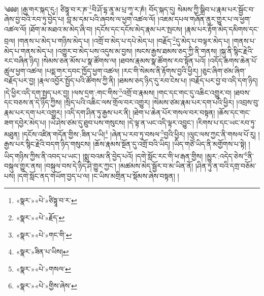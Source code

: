  ༄༅༅། །རྒྱ་གར་སྐད་དུ:། ཙིཏྟཱ་བ་ར་ཎ་\footnote{«སྣར་»«པེ་»ཙིཏྟཱ་བ་ར་}བི་ཤོ་དྷ་ནཱ་མ་པྲ་ཀཱ་ར་ཎཾ། བོད་སྐད་དུ། སེམས་ཀྱི་སྒྲིབ་པ་རྣམ་པར་སྦྱོང་བ་ཞེས་བྱ་བའི་རབ་ཏུ་བྱེད་པ། བླ་མ་དམ་པའི་ཞབས་ལ་ཕྱག་འཚལ་ལོ། །འཇམ་དཔལ་གཞོན་ནུར་གྱུར་པ་ལ་ཕྱག་འཚལ་ལོ། །ཐོག་མ་མཐའ་མ་མེད་ཞི་བ། །དངོས་དང་དངོས་མེད་རྣམ་པར་སྤངས། །རྣམ་པར་རྟོག་མེད་དམིགས་དང་བྲལ། །གནས་པ་མེད་པ་གཉིས་མེད་པ། །འགྲོ་བ་མེད་པ་དཔེ་མེད་པ། །བརྗོད་\footnote{«སྣར་»«པེ་»རྗོད་}དུ་མེད་པ་བལྟར་མེད་པ། །གནས་པ་མེད་པ་གནས་མེད་པ། །འགྱུར་བ་མེད་པས་འདུས་མ་བྱས། །སངས་རྒྱས་ཐམས་ཅད་ཀྱི་ནི་གནས། །སྐུ་ནི་སྙིང་རྗེའི་རང་བཞིན་ཉིད། །སེམས་ཅན་མོས་པ་སྣ་ཚོགས་ལ། །ཐབས་རྣམས་སྣ་ཚོགས་རབ་སྟོན་པའོ། །འདོད་ཆགས་ཆེན་པོ་ཚུལ་ཕྱག་འཚལ། །པདྨ་གར་དབང་ཁྱོད་ཕྱག་འཚལ། །རང་གི་སེམས་ནི་རྟོགས་བྱའི་ཕྱིར། །ཅུང་ཞིག་ཙམ་ཞིག་བརྗོད་པར་བྱ། །རྣལ་འབྱོར་སྤྱོད་པའི་ཚོགས་ཀྱི་ནི། །ཐམས་ཅད་ཉིད་དུ་རབ་ངེས་པ། །བརྗོད་པར་བྱ་བ་འདི་དག་ཉིད། །དེ་ཕྱིར་འདི་དག་སྤྱད་པར་བྱ། །ལས་དྲག་:གང་གིས་\footnote{«སྣར་»«པེ་»གང་གི་}འགྲོ་བ་རྣམས། །གང་དང་གང་དུ་འཆིང་འགྱུར་བ། །ཐབས་དང་བཅས་ན་དེ་ཉིད་ཀྱིས། །སྲིད་པའི་འཆིང་ལས་གྲོལ་བར་འགྱུར། །སེམས་ཙམ་རྣམ་པར་དག་པའི་ཕྱིར། །འབྲས་བུ་རྣམ་པར་དག་པར་འགྱུར། །འདི་དག་ཤིན་ཏུ་རྒྱས་པར་ནི། །ཐེག་པ་ཆེན་པོར་གསལ་བར་བསྟན། །ཆོས་དང་གང་ཟག་དབྱེར་མེད་པ། །ཡེ་ཤེས་ཙམ་དུ་ཐུབ་པས་གསུངས། །དེ་ལྟ་ན་ཡང་འདི་ལྟར་འབྱུང་། །རིགས་པ་དང་ཡང་རབ་ཏུ་མཐུན། །དངོས་འཛིན་གདོན་གྱིས་:ཟིན་པ་ཡི།\footnote{«སྣར་»ཟིན་པ་ཡིས།} །ཞེན་པ་རབ་ཏུ་བསལ་\footnote{«སྣར་»«པེ་»གསལ་}བྱའི་ཕྱིར། །ལུང་ལས་ཀྱང་ནི་གསལ་པོ་རུ། །རྒྱས་པར་སྙིང་རྗེའི་བདག་ཉིད་གསུངས། །ཆོས་རྣམས་སྔོན་དུ་འགྲོ་བའི་ཡིད། །ཡིད་གཙོ་ཡིད་ནི་མགྱོགས་པ་སྟེ། །ཡིད་གཉིས་ཀྱིས་ནི་འབད་པ་ཡང་། །སྨྲ་བའམ་ནི་བྱེད་པའོ། །དགེ་སློང་རང་གི་ཕ་རྒན་གྱིས། །མྱུར་:འདེད་ཅེས་\footnote{«སྣར་»«པེ་»གྱིས་ཞེས་}ནི་བསྐུལ་གྱུར་ནས། །བསྐུལ་བས་དེ་ཉིད་ཤི་གྱུར་ཀྱང་། །མཚམས་མེད་སྦྱོར་བ་མ་ཡིན་ནོ། །ཤིན་ཏུ་ན་བའི་དགྲ་བཅོམ་པས། །དགེ་སློང་ནད་གཡོག་བྱད་པ་ལ། །ང་ཡིས་མགྲིན་པ་སྡོམས་ཞེས་བསྟན། །

